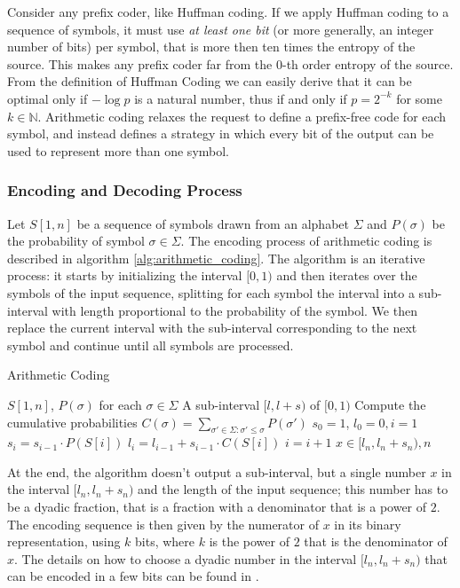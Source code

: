 \noindent Consider any prefix coder, like Huffman coding. If we apply Huffman coding to a sequence of symbols, it must use \emph{at least one bit} (or more generally, an integer number of bits) per symbol, that is more then ten times the entropy of the source. This makes any prefix coder far from the $0$-th order entropy of the source. From the definition of Huffman Coding we can easily derive that it can be optimal only if $-\log p$ is a natural number, thus if and only if $p = 2^{-k}$ for some $k \in \mathbb{N}$. Arithmetic coding relaxes the request to define a prefix-free code for each symbol, and instead defines a strategy in which every bit of the output can be used to represent more than one symbol.

\subsubsection*{Encoding and Decoding Process}
Let $S[1,n]$ be a sequence of symbols drawn from an alphabet $\Sigma$ and $P(\sigma)$ be the probability of symbol $\sigma \in \Sigma$. The encoding process of arithmetic coding is described in algorithm \ref{alg:arithmetic_coding}. The algorithm is an iterative process: it starts by initializing the interval $[0,1)$ and then iterates over the symbols of the input sequence, splitting for each symbol the interval into a sub-interval with length proportional to the probability of the symbol. We then replace the current interval with the sub-interval corresponding to the next symbol and continue until all symbols are processed.

\begin{algorithm}
    \caption{Arithmetic Coding} \label{alg:arithmetic_coding}
    \begin{algorithmic}
        \Require $S[1,n]$, $P(\sigma)$ for each $\sigma \in \Sigma$
        \Ensure A sub-interval $[l,l+s)$ of $[0,1)$
        \State Compute the cumulative probabilities $C(\sigma) = \sum_{\sigma' \in \Sigma: \sigma' \leq \sigma} P(\sigma')$
        \State $s_0 = 1$, $l_0 = 0, i = 1$
        \State $s_i = s_{i-1} \cdot P(S[i])$
        \State $l_i = l_{i-1} + s_{i-1} \cdot C(S[i])$
        \State $i = i + 1$
        \EndWhile
        \State \Return $x \in [l_n, l_n + s_n), n$
    \end{algorithmic}
\end{algorithm}

\noindent At the end, the algorithm doesn't output a sub-interval, but a single number $x$ in the interval $[l_n, l_n + s_n)$ and the length of the input sequence; this number has to be a dyadic fraction, that is a fraction with a denominator that is a power of $2$. The encoding sequence is then given by the numerator of $x$ in its binary representation, using $k$ bits, where $k$ is the power of $2$ that is the denominator of $x$. The details on how to choose a dyadic number in the interval $[l_n, l_n + s_n)$ that can be encoded in a few bits can be found in \cite{ferragina2023pearls,han2002mathematics,sayood2002lossless}.


